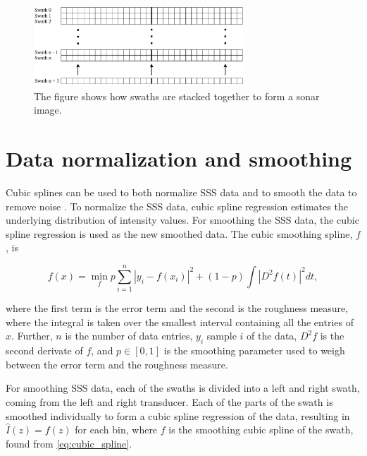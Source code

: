 \hspace{0.5 cm}

\begin{figure}[h]
    \centering
    \includegraphics[width=0.7\textwidth]{figures/stacking_of_sonar_image.drawio.pdf}
    \caption{The figure shows how swaths are stacked together to form a sonar image.}
    \label{fig:stacking_of_sonar_image}
\end{figure}

\hspace{0.5 cm}

\section{Data normalization and smoothing}

Cubic splines can be used to both normalize SSS data \cite{ReitanHogstad2022Side-ScanAutonomy} and to smooth the data to remove noise \cite{Al-Rawi2017LandmarkImages}. To normalize the SSS data, cubic spline regression estimates the underlying distribution of intensity values. For smoothing the SSS data, the cubic spline regression is used as the new smoothed data. The cubic smoothing spline, $f$, is 

\begin{equation}
    {f}(x) = \min_{f} p \sum_{i=1}^n |y_i-f(x_i)|^2 + (1-p) \int|D^2f(t)|^2dt,
    \label{eq:cubic_spline}
\end{equation}

where the first term is the error term and the second is the roughness measure,  where the integral is taken over the smallest interval containing all the entries of $x$. Further, $n$ is the number of data entries, $y_i$ sample $i$ of the data, $D^2f$ is the second derivate of $f$, and $p \in [0,1]$ is the smoothing parameter used to weigh between the error term and the roughness measure. 

For smoothing SSS data, each of the swaths is divided into a left and right swath, coming from the left and right transducer. Each of the parts of the swath is smoothed individually to form a cubic spline regression of the data, resulting in $\hat{I}(z) = f(z)$ for each bin, where $f$ is the smoothing cubic spline of the swath, found from \cref{eq:cubic_spline}.


